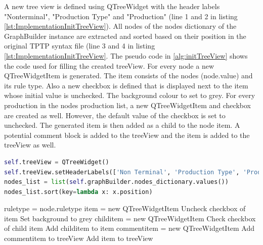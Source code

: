 A new tree view is defined using QTreeWidget with the header labels "Nonterminal", "Production Type" and "Production" (line 1 and 2 in listing \ref{lst:ImplementationInitTreeView}).
All nodes of the nodes dictionary of the GraphBuilder instance are extracted and sorted based on their position in the original \ac{TPTP} syntax file (line 3 and 4 in listing \ref{lst:ImplementationInitTreeView}. 
The pseudo code in \ref{alg:initTreeView} shows the code used for filling the created treeView. For every node a new QTreeWidgetItem is generated. The item consists of the nodes (node.value) and its rule type. Also a new checkbox is defined that is displayed next to the item whose initial value is unchecked. The background colour to set to grey.
For every production in the nodes production list, a new QTreeWidgetItem and checkbox are created as well. However, the default value of the checkbox is set to unchecked. The generated item is then added as a child to the node item. A potential comment block is added to the treeView and the item is added to the treeView as well.

\begin{lstlisting}[language=Python, basicstyle=\scriptsize	,caption= Init Tree View,label= lst:ImplementationInitTreeView]
self.treeView = QTreeWidget()
self.treeView.setHeaderLabels(['Non Terminal', 'Production Type', 'Production'])
nodes_list = list(self.graphBuilder.nodes_dictionary.values())
nodes_list.sort(key=lambda x: x.position)
\end{lstlisting}

\begin{algorithm}[H]
\caption{GUI Pseudo Code: init\textunderscore tree\textunderscore view}
\label{alg:initTreeView}
\begin{algorithmic}[1] 
	\State rule\textunderscore type = node.rule\textunderscore type
	\State item = new QTreeWidgetItem
    \State Uncheck checkbox of item 
    \State Set background to grey
		\State child\textunderscore item = new QTreeWidgetItem
		\State Check checkbox of child item
		\State Add child\textunderscore item to item
	\EndFor    
		\State comment\textunderscore item = new QTreeWidgetItem
		\State Add comment\textunderscore item to treeView
	\EndIf
	\State Add item to treeView
\EndFor
\end{algorithmic}
\end{algorithm}
	
